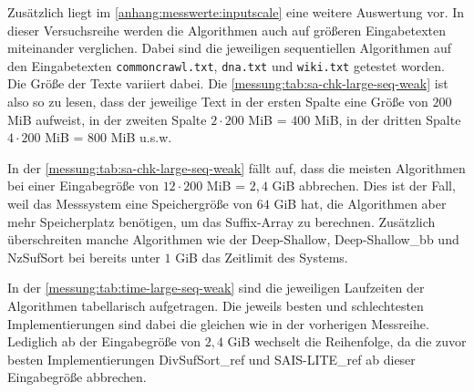 Zusätzlich liegt im \cref{anhang:messwerte:inputscale} eine weitere Auswertung vor. In dieser Versuchsreihe werden die Algorithmen auch auf größeren Eingabetexten miteinander verglichen. Dabei sind die jeweiligen sequentiellen Algorithmen auf den Eingabetexten \texttt{commoncrawl.txt}, \texttt{dna.txt} und \texttt{wiki.txt} getestet worden. Die Größe der Texte variiert dabei. Die \cref{messung:tab:sa-chk-large-seq-weak} ist also so zu lesen, dass der jeweilige Text in der ersten Spalte eine Größe von $200$ MiB aufweist, in der zweiten Spalte $2\cdot200$ MiB = $400$ MiB, in der dritten Spalte $4\cdot200$ MiB = $800$ MiB u.s.w.

In der \cref{messung:tab:sa-chk-large-seq-weak} fällt auf, dass die meisten Algorithmen bei einer Eingabegröße von $12\cdot200$ MiB = $2,4$ GiB abbrechen. Dies ist der Fall, weil das Messsystem eine Speichergröße von $64$ GiB hat, die Algorithmen aber mehr Speicherplatz benötigen, um das Suffix-Array zu berechnen. Zusätzlich überschreiten manche Algorithmen wie der Deep-Shallow, Deep-Shallow\_bb und NzSufSort bei bereits unter $1$ GiB das Zeitlimit des Systems.

In der \cref{messung:tab:time-large-seq-weak} sind die jeweiligen Laufzeiten der Algorithmen tabellarisch aufgetragen. Die jeweils besten und schlechtesten Implementierungen sind dabei die gleichen wie in der vorherigen Messreihe. Lediglich ab der Eingabegröße von $2,4$ GiB wechselt die Reihenfolge, da die zuvor besten Implementierungen DivSufSort\_ref und SAIS-LITE\_ref ab dieser Eingabegröße abbrechen.